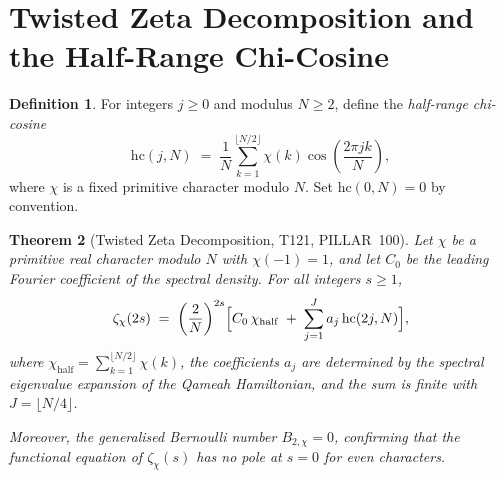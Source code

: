 \documentclass[aps,prd,twocolumn,superscriptaddress,floatfix,nofootinbib]{revtex4-2}
\newtheorem{theorem}{Theorem}
\theoremstyle{definition}
\newtheorem{definition}[theorem]{Definition}
\theoremstyle{remark}
\begin{document}
\section{Twisted Zeta Decomposition and the Half-Range Chi-Cosine}\label{sec:twisted}
\begin{definition}\label{def:half-range}
  For integers $j \ge 0$ and modulus $N \ge 2$, define the
  \emph{half-range chi-cosine}
  \[
    \mathrm{hc}(j,N) \;=\; \frac{1}{N}\sum_{k=1}^{\lfloor N/2\rfloor}
      \chi(k)\cos\!\left(\frac{2\pi jk}{N}\right),
  \]
  where $\chi$ is a fixed primitive character modulo $N$.
  Set $\mathrm{hc}(0,N) = 0$ by convention.
\end{definition}

\begin{theorem}[Twisted Zeta Decomposition, T121, PILLAR~100]\label{thm:twisted-zeta}
  Let $\chi$ be a primitive real character modulo $N$ with $\chi(-1) = 1$,
  and let $C_0$ be the leading Fourier coefficient of the spectral density.
  For all integers $s \ge 1$,
  \[
    \zeta_\chi(2s)
      \;=\;
      \left(\frac{2}{N}\right)^{2s}
      \!\Bigl[
        C_0\,\chi_{\mathrm{half}}
        \;+\;
        \sum_{j=1}^{J} a_j\,\mathrm{hc}(2j,N)
      \Bigr],
  \]
  where $\chi_{\mathrm{half}} = \sum_{k=1}^{\lfloor N/2\rfloor}\chi(k)$,
  the coefficients $a_j$ are determined by the spectral eigenvalue
  expansion of the Qameah Hamiltonian, and the sum is finite with
  $J = \lfloor N/4 \rfloor$.

  Moreover, the generalised Bernoulli number $B_{2,\chi} = 0$, confirming
  that the functional equation of $\zeta_\chi(s)$ has no pole at $s = 0$
  for even characters.
\end{theorem}
\end{document}
